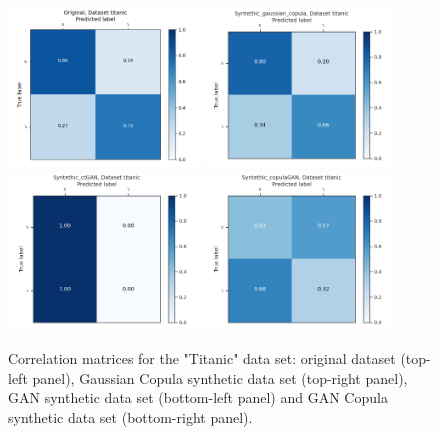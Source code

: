 \documentclass{article}
\begin{document}
\begin{figure}[h!]
	\centering
	\includegraphics[width=0.45\textwidth]{../ConfusionMatrixes/titanic_Original_.png}
	\includegraphics[width=0.45\textwidth]{../ConfusionMatrixes/titanic_Syntethic_gaussian_copula_.png}
	\includegraphics[width=0.45\textwidth]{../ConfusionMatrixes/titanic_Syntethic_ctGAN_.png}
	\includegraphics[width=0.45\textwidth]{../ConfusionMatrixes/titanic_Syntethic_copulaGAN_.png}
	
	\caption{Correlation matrices for the "Titanic" data set: original dataset (top-left panel), Gaussian Copula synthetic data set (top-right panel), GAN synthetic data set (bottom-left panel) and GAN Copula synthetic data set (bottom-right panel).  }
	\label{confusion_titanic}
\end{figure}
\end{document}
